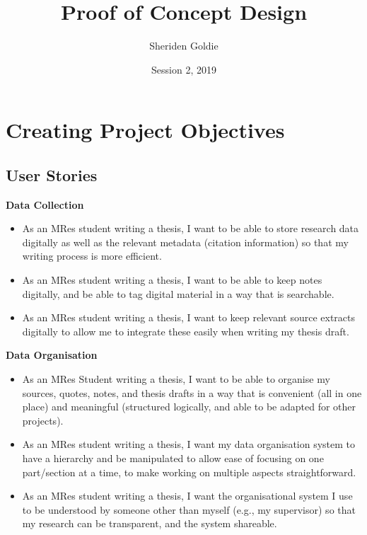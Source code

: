\documentclass{article}
\title{Proof of Concept Design}
\author{Sheriden Goldie}
\date{Session 2, 2019}
\begin{document}
\maketitle

\tableofcontents

\pagebreak

\section{Creating Project Objectives}
\subsection{User Stories}

\textbf{Data Collection}
\begin{itemize}
    \item As an MRes student writing a thesis, I want to be able to store research data digitally as well as the relevant metadata (citation information) so that my writing process is more efficient.
    \item As an MRes student writing a thesis, I want to be able to keep notes digitally, and be able to tag digital material in a way that is searchable.
    \item As an MRes student writing a thesis, I want to keep relevant source extracts digitally to allow me to integrate these easily when writing my thesis draft. 
\end{itemize}

\noindent \textbf{Data Organisation}
\begin{itemize}
    \item As an MRes Student writing a thesis, I want to be able to organise my sources, quotes, notes, and thesis drafts in a way that is convenient (all in one place) and meaningful (structured logically, and able to be adapted for other projects).
    \item As an MRes student writing a thesis, I want my data organisation system to have a hierarchy and be manipulated to allow ease of focusing on one part/section at a time, to make working on multiple aspects straightforward.
    \item As an MRes student writing a thesis, I want the organisational system I use to be understood by someone other than myself (e.g., my supervisor) so that my research can be transparent, and the system shareable.
\end{itemize}
\end{document}
